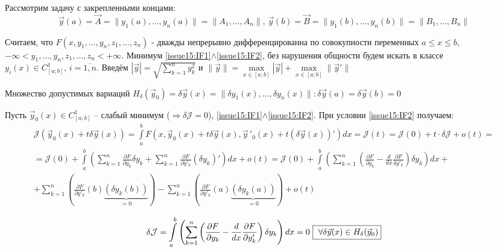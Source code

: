     Рассмотрим задачу с закрепленными концами: 
    \begin{equation} \label{issue15:IF2}
        \vec{y}(a) = \vec{A} = \| y_1(a), ..., y_n(a)\| = \| A_1, ..., A_n\|,\, \vec{y}(b) = \vec{B} = \| y_1(b), ..., y_n(b)\| = \| B_1, ..., B_n \|
    \end{equation}
    
    Считаем, что $F(x, y_1, ..., y_n, z_1, ..., z_n)$ - дважды непрерывно дифференцированна по совокупности переменных $a \leq x \leq b$, $-\infty < y_1, ..., y_n, z_1, ..., z_n < +\infty$. 
    Минимум \eqref{issue15:IF1}$\wedge$\eqref{issue15:IF2}, без нарушения общности будем искать в классе $y_i(x) \in C^1_{[a;b]}, \, i = \overline{1, n}$. 
    Введём $|\vec{y}| = \sqrt{\sum \limits_{k=1}^{n} y^2_k}$ и $\|\vec{y}\| = \max \limits_{x \in [a;b]} |\vec{y}| + \max \limits_{x \in [a;b]} \| \vec{y}' \|$ 

    Множество допустимых вариаций $H_{\delta}(\vec{y}_0) = {\delta \vec{y}(x) = \| \delta y_1 (x), ..., \delta y_n(x)\|: \delta \vec{y}(a) = \delta \vec{y}(b) = 0}$

    Пусть $\vec{y}_0(x) \in C^1_{[a;b]}$ -- слабый минимум ($\Rightarrow \delta \mathcal{J} = 0$), \eqref{issue15:IF1}$\wedge$\eqref{issue15:IF2}. При условии \eqref{issue15:IF2} получаем:
    \begin{multline*}
            \mathcal{J}(\vec{y}_0(x) + t \delta \vec{y}(x)) = \int \limits_a^b F(x, \vec{y}_0(x) + t\delta \vec{y}(x), \vec{y}\,'_0(x) + t(\delta \vec{y}(x))')dx = \mathcal{J}(t) = \mathcal{J}(0) + t \cdot \delta\mathcal{J} + o(t) = \\
            = \mathcal{J}(0) + \int \limits_a^b \left( \sum \limits_{k =1}^n \frac{\partial F}{\partial y_k} \delta y_k + \sum \limits_{k=1}^n \frac{\partial F}{\partial y'_k} (\delta y_k)' \right) dx + o(t) = \mathcal{J}(0) + \int \limits_a^b \left( \sum \limits_{k = 1}^n \left( \frac{\partial F}{\partial y_k} - \frac{d}{dx} \frac{\partial F}{\delta y'_k}  \right) \delta y_k \right) dx + \\
            + \sum \limits_{k = 1}^n \left( \frac{\partial F}{\partial y'_k}(b) \underbrace{(\delta y_k (b))}_{= 0} \right) - \sum \limits_{k = 1}^n \left( \frac{\partial F}{\partial y'_k}(a) \underbrace{(\delta y_k (a))}_{= 0} \right) + o(t) 
    \end{multline*}

    \[ \delta \mathcal{J} = \int \limits_a^b \left(\sum \limits_{k = 1}^n \left( \frac{\partial F}{\partial y_k} - 
    \frac{d}{dx} \frac{\partial F}{\partial y'_k} \right) \delta y_k \right) dx = 0 \,\, 
    \text{\fbox{  $\forall \delta \vec{y}(x) \in H_{\delta}(\vec{y}_0) $}}
    \]

